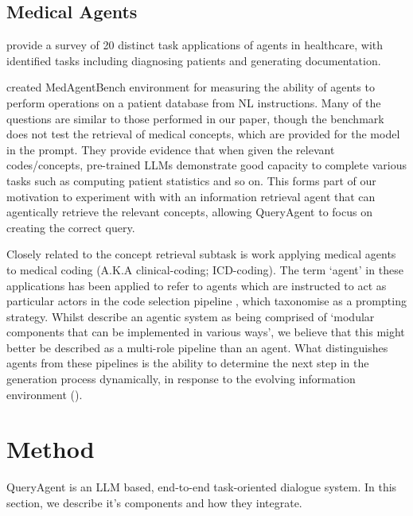 \documentclass[11pt]{article}
\begin{document}
\subsection{Medical Agents}
\citep{wang_survey_2025} provide a survey of 20 distinct task applications of agents in healthcare, with identified tasks including diagnosing patients and generating documentation.

\citep{jiang_medagentbench_2025} created MedAgentBench environment for measuring the ability of agents to perform operations on a patient database from NL instructions.
Many of the questions are similar to those performed in our paper, though the benchmark does not test the retrieval of medical concepts, which are provided for the model in the prompt.
They provide evidence that when given the relevant codes/concepts, pre-trained LLMs demonstrate good capacity to complete various tasks such as computing patient statistics and so on.
This forms part of our motivation to experiment with with an information retrieval agent that can agentically retrieve the relevant concepts, allowing QueryAgent to focus on creating the correct query. 

Closely related to the concept retrieval subtask is work applying medical agents to medical coding (A.K.A clinical-coding; ICD-coding). The term `agent' in these applications has been applied to refer to agents which are instructed to act as particular actors in the code selection pipeline \cite{li_exploring_2024,motzfeldt_code_2025}, which \cite{schulhoff_prompt_2024} taxonomise as a prompting strategy.
Whilst \citet{motzfeldt_code_2025} describe an agentic system as being comprised of `modular components that can be implemented in various ways', we believe that this might better be described as a multi-role pipeline than an agent.
What distinguishes agents from these pipelines is the ability to determine the next step in the generation process dynamically, in response to the evolving information environment (\citet{zhang_agentic_2025}).

\section{Method}

QueryAgent is an LLM based, end-to-end task-oriented dialogue system.
In this section, we describe it's components and how they integrate.

\end{document}
